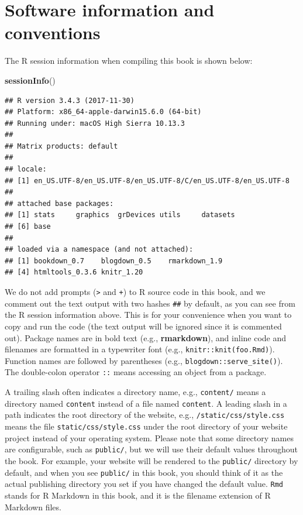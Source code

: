 \documentclass[12pt,]{krantz}
\makeatletter
\newenvironment{Shaded}{\begin{snugshade}}{\end{snugshade}}
\newcommand{\KeywordTok}[1]{\textcolor[rgb]{0.13,0.29,0.53}{\textbf{#1}}}
\newcommand{\NormalTok}[1]{#1}
\newenvironment{kframe}{%
\medskip{}
\setlength{\fboxsep}{.8em}
 \def\at@end@of@kframe{}%
 \ifinner\ifhmode%
  \def\at@end@of@kframe{\end{minipage}}%
  \begin{minipage}{\columnwidth}%
 \fi\fi%
 \def\FrameCommand##1{\hskip\@totalleftmargin \hskip-\fboxsep
 \colorbox{shadecolor}{##1}\hskip-\fboxsep
     \hskip-\linewidth \hskip-\@totalleftmargin \hskip\columnwidth}%
 \MakeFramed {\advance\hsize-\width
   \@totalleftmargin\z@ \linewidth\hsize
   \@setminipage}}%
 {\par\unskip\endMakeFramed%
 \at@end@of@kframe}
\renewenvironment{Shaded}{\begin{kframe}}{\end{kframe}}
\theoremstyle{definition}
\theoremstyle{definition}
\theoremstyle{definition}
\theoremstyle{remark}
\makeatother
\begin{document}
\hypertarget{software-info}{%
\section*{Software information and conventions}\label{software-info}}


The R session information when compiling this book is shown below:

\begin{Shaded}
\begin{Highlighting}[]
\KeywordTok{sessionInfo}\NormalTok{()}
\end{Highlighting}
\end{Shaded}

\begin{verbatim}
## R version 3.4.3 (2017-11-30)
## Platform: x86_64-apple-darwin15.6.0 (64-bit)
## Running under: macOS High Sierra 10.13.3
## 
## Matrix products: default
## 
## locale:
## [1] en_US.UTF-8/en_US.UTF-8/en_US.UTF-8/C/en_US.UTF-8/en_US.UTF-8
## 
## attached base packages:
## [1] stats     graphics  grDevices utils     datasets 
## [6] base     
## 
## loaded via a namespace (and not attached):
## [1] bookdown_0.7    blogdown_0.5    rmarkdown_1.9  
## [4] htmltools_0.3.6 knitr_1.20
\end{verbatim}

We do not add prompts (\texttt{\textgreater{}} and \texttt{+}) to R
source code in this book, and we comment out the text output with two
hashes \texttt{\#\#} by default, as you can see from the R session
information above. This is for your convenience when you want to copy
and run the code (the text output will be ignored since it is commented
out). Package names are in bold text (e.g., \textbf{rmarkdown}), and
inline code and filenames are formatted in a typewriter font (e.g.,
\texttt{knitr::knit(\textquotesingle{}foo.Rmd\textquotesingle{})}).
Function names are followed by parentheses (e.g.,
\texttt{blogdown::serve\_site()}). The double-colon operator \texttt{::}
means accessing an object from a package.

A trailing slash often indicates a directory name, e.g.,
\texttt{content/} means a directory named \texttt{content} instead of a
file named \texttt{content}. A leading slash in a path indicates the
root directory of the website, e.g., \texttt{/static/css/style.css}
means the file \texttt{static/css/style.css} under the root directory of
your website project instead of your operating system. Please note that
some directory names are configurable, such as \texttt{public/}, but we
will use their default values throughout the book. For example, your
website will be rendered to the \texttt{public/} directory by default,
and when you see \texttt{public/} in this book, you should think of it
as the actual publishing directory you set if you have changed the
default value. \texttt{Rmd} stands for R Markdown in this book, and it
is the filename extension of R Markdown files.
\end{document}
